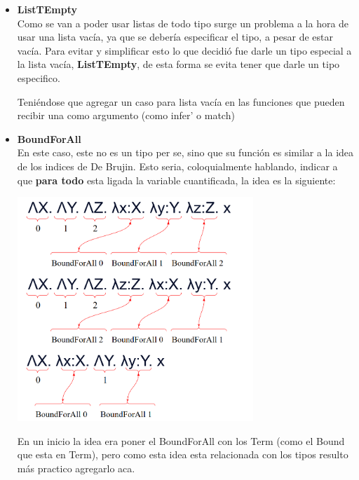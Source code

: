 \documentclass[12pt, titlepage, a4paper]{article}
\begin{document}
\begin{itemize}[label=$\bullet$]
  \item {\textbf{ListTEmpty}\\
  Como se van a poder usar listas de todo tipo surge un problema a la hora de usar una lista vacía, ya que se debería especificar el tipo, 
  a pesar de estar vacía. 
  Para evitar y simplificar esto lo que decidió fue darle un tipo especial a la lista vacía, \textbf{ListTEmpty}, de esta forma se evita 
  tener que darle un tipo especifico.
  
  Teniéndose que agregar un caso para lista vacía en las funciones que pueden recibir una como argumento (como infer' o match)

  }

  \item {\textbf{BoundForAll}\\
  En este caso, este no es un tipo per se, sino que su función es similar a la idea 
  de los indices de De Brujin. Esto seria, coloquialmente hablando, indicar a que \textbf{para todo} esta ligada la variable cuantificada, la idea es la siguiente:

  \begin{center}
      \includegraphics[width=0.7\textwidth]{Imagenes/EjemploBoundForAll.png}
  \end{center}

  En un inicio la idea era poner el BoundForAll con los Term (como el Bound que esta en Term), pero como esta idea esta relacionada con 
  los tipos resulto más practico agregarlo aca.}
  
  \end{itemize}
\end{document}
